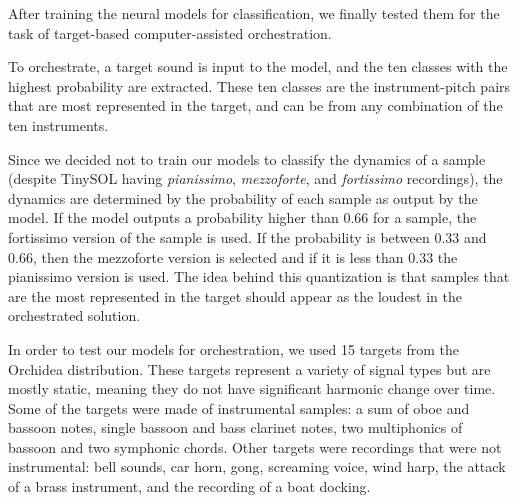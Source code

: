 \documentclass[runningheads,a4paper]{llncs}
\begin{document}
After training the neural models for classification, we finally tested them for the task of target-based computer-assisted orchestration. 

To orchestrate, a target sound is input to the model, and the ten classes with the highest probability are extracted. These ten classes are the instrument-pitch pairs that are most represented in the target, and can be from any combination of the ten instruments. 

Since we decided not to train our models to classify the dynamics of a sample (despite TinySOL having \emph{pianissimo}, \emph{mezzoforte}, and \emph{fortissimo} recordings), the dynamics are determined by the probability of each sample as output by the model. If the model outputs a probability higher than $0.66$ for a sample, the fortissimo version of the sample is used. If the probability is between $0.33$ and $0.66$, then the mezzoforte version is selected and if it is less than $0.33$ the pianissimo version is used. The idea behind this quantization is that samples that are the most represented in the target should appear as the loudest in the orchestrated solution.

In order to test our models for orchestration, we used 15 targets from the Orchidea distribution. These targets represent a variety of signal types but are mostly static, meaning they do not have significant harmonic change over time. Some of the targets were made of instrumental samples: a sum of oboe and bassoon notes, single bassoon and bass clarinet notes, two multiphonics of bassoon and two symphonic chords. Other targets were recordings that were not instrumental: bell sounds, car horn, gong, screaming voice, wind harp, the attack of a brass instrument, and the recording of a boat docking.
\end{document}
